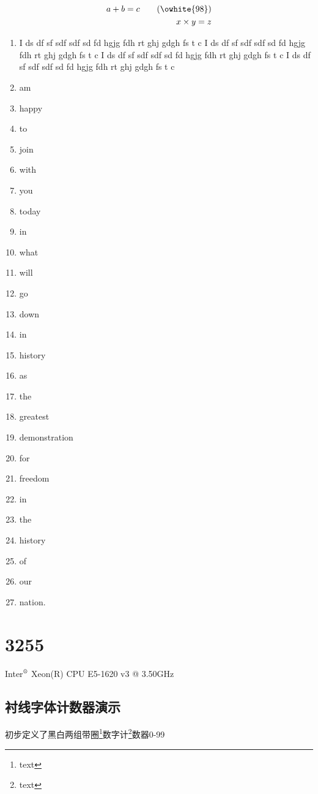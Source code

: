 \documentclass{ctexbook}
\begin{document}
\renewcommand{\theequation}{\owhite{\value{equation}}}
\begin{align}
a + b = c \tag{\owhite{98}}\\
x \times y = z
\end{align}
\begin{enumerate}[label=\protect\owhitecnt]
\item I ds df sf sdf sdf sd fd hgjg fdh rt ghj gdgh fs t c I ds df sf sdf sdf sd fd hgjg fdh rt ghj gdgh fs t c I ds df sf sdf sdf sd fd hgjg fdh rt ghj gdgh fs t c I ds df sf sdf sdf sd fd hgjg fdh rt ghj gdgh fs t c 
\item am
\item happy
\item to
\item join
\item with
\item you
\item today
\item in
\item what
\item will
\item go
\item down
\item in
\item history
\item as
\item the
\item greatest
\item demonstration
\item for
\item freedom
\item in
\item the
\item history
\item of
\item our
\item nation.
\end{enumerate}

\addtocounter{footnote}{71}
\renewcommand{\thefootnote}{\owhite{\value{footnote}}}
\chapter{3255}
Inter$^\text{\textregistered}$ Xeon(R) CPU E5-1620 v3 @ 3.50GHz
\section{衬线字体计数器演示}
初步定义了黑白两组带圈\footnote{text}数字计\footnote{text}数器0-99
\setcounter{strw}{45}\setcounter{strb}{67}
\oblackcnt\oblackcnt\oblackcnt\owhitecnt\owhitecnt\owhitecnt
\end{document}
